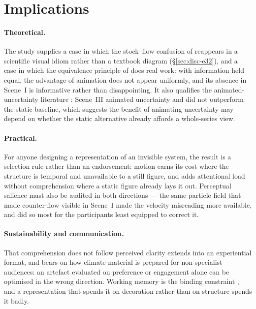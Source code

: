 \section{Implications}
\label{sec:disc-implications}

\paragraph{Theoretical.} The study supplies a case in which the stock--flow confusion of \textcite{sterman2008} reappears in a scientific visual idiom rather than a textbook diagram (\S\ref{sec:disc-e32}), and a case in which the equivalence principle of \textcite{tversky2002} does real work: with information held equal, the advantage of animation does not appear uniformly, and its absence in Scene~I is informative rather than disappointing. It also qualifies the animated-uncertainty literature \parencite{hullman2015hops, kale2019hops}: Scene~III animated uncertainty and did not outperform the static baseline, which suggests the benefit of animating uncertainty may depend on whether the static alternative already affords a whole-series view.

\paragraph{Practical.} For anyone designing a representation of an invisible system, the result is a selection rule rather than an endorsement: motion earns its cost where the structure is temporal and unavailable to a still figure, and adds attentional load without comprehension where a static figure already lays it out. Perceptual salience must also be audited in both directions --- the same particle field that made counter-flow visible in Scene~I made the velocity misreading more available, and did so most for the participants least equipped to correct it.

\paragraph{Sustainability and communication.} That comprehension does not follow perceived clarity extends \textcite{kause2020} into an experiential format, and bears on how climate material is prepared for non-specialist audiences: an artefact evaluated on preference or engagement alone can be optimised in the wrong direction. Working memory is the binding constraint \parencite{sweller1988}, and a representation that spends it on decoration rather than on structure spends it badly.

